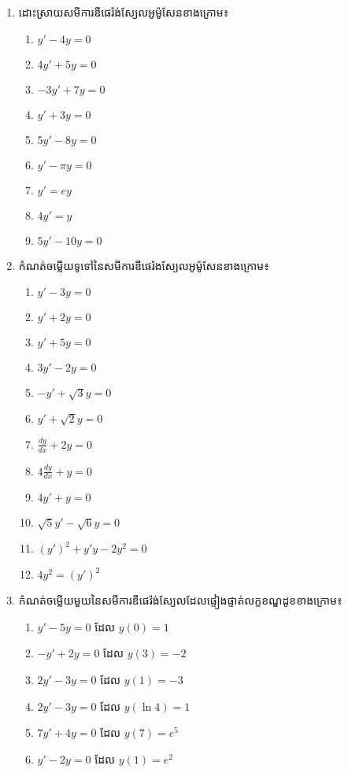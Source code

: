\documentclass[12pt, a4paper]{article}
\begin{document}
\maketitle
\begin{enumerate}[m]
	\item ដោះស្រាយសមីការឌីផេរ៉ង់ស្យែលអូម៉ូសែនខាងក្រោម៖
	\begin{enumerate}[k,3]
		\item $y'-4y=0$
		\item $4y'+5y=0$
		\item $-3y'+7y=0$
		\item $y'+3y=0$
		\item $5y'-8y=0$
		\item $y'-\pi y=0$
		\item $y'=ey$
		\item $4y'=y$
		\item $5y'-10y=0$
	\end{enumerate}
	\item កំណត់ចម្លើយទូទៅនៃសមីការឌីផេរ៉ងស្យែលអូម៉ូសែនខាងក្រោម៖
	\begin{enumerate}[k,3]
		\item $y'-3y=0$
		\item $y'+2y=0$
		\item $y'+5y=0$
		\item $3y'-2y=0$
		\item $-y'+\sqrt{3}y=0$
		\item $y'+\sqrt{2}y=0$
		\item $\frac{dy}{dx}+2y=0$
		\item $4\frac{dy}{dx}+y=0$
		\item $4y'+y=0$
		\item $\sqrt{5}y'-\sqrt{6}y=0$
		\item $\left(y'\right)^2+y'y-2y^2=0$
		\item $4y^2=\left(y'\right)^2$
	\end{enumerate}
	\item កំណត់ចម្លើយមួយនៃសមីការឌីផេរ៉ង់ស្យែលដែលផ្ទៀងផ្ទាត់លក្ខខណ្ឌដូខខាងក្រោម៖
	\begin{enumerate}[k,2]
		\item $y'-5y=0$ ដែល $y(0)=1$
		\item $-y'+2y=0$ ដែល $y(3)=-2$
		\item $2y'-3y=0$ ដែល $y(1)=-3$
		\item $2y'-3y=0$ ដែល $y(\ln4)=1$
		\item $7y'+4y=0$ ដែល $y(7)=e^5$
		\item $y'-2y=0$ ដែល $y(1)=e^2$
	\end{enumerate}

\end{enumerate}
\end{document}

